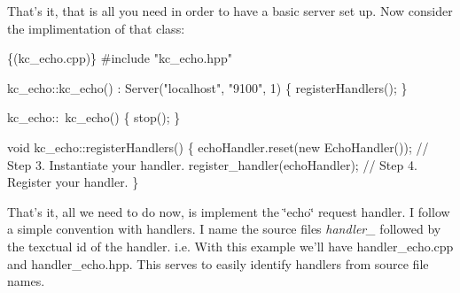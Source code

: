 That's it, that is all you need in order to have a basic server set up. Now consider the implimentation of that class\-:


\begin{DoxyCode}
\{(kc\_echo.cpp)\}
#include \textcolor{stringliteral}{"kc\_echo.hpp"}

kc\_echo::kc\_echo() : Server(\textcolor{stringliteral}{"localhost"}, \textcolor{stringliteral}{"9100"}, 1)
\{
  registerHandlers();
\}

kc\_echo::~kc\_echo()
\{
  stop();
\}

\textcolor{keywordtype}{void} kc\_echo::registerHandlers()
\{
  echoHandler.reset(\textcolor{keyword}{new} EchoHandler()); \textcolor{comment}{// Step 3. Instantiate your handler.}
  register\_handler(echoHandler);        \textcolor{comment}{// Step 4. Register your handler.}
\}
\end{DoxyCode}


That's it, all we need to do now, is implement the \char`\"{}echo\char`\"{} request handler. I follow a simple convention with handlers. I name the source files {\itshape handler\-\_\-} followed by the texctual id of the handler. i.\-e. With this example we'll have handler\-\_\-echo.\-cpp and handler\-\_\-echo.\-hpp. This serves to easily identify handlers from source file names.

